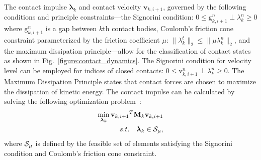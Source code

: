 The contact impulse $\bm\lambda_{k}$ and contact velocity $\textbf{v}_{k,i+1}$, governed by the following conditions and principle constraints—the Signorini condition: $0\leq\text{g}^{n}_{k,i+1}\perp{{\lambda}^{n}_{k}}\geq0$ where $\text{g}^{n}_{k,i+1}$ is a gap between $k$th contact bodies, Coulomb's friction cone constraint parameterized by the friction coefficient $\mu$: $\| \lambda^{t}_{k} \|_{2} \leq \|\mu\lambda^{n}_{k}\|_{2} $, and the maximum dissipation principle—allow for the classification of contact states as shown in Fig.~\ref{figure:contact_dynamics}. The Signorini condition for velocity level can be employed for indices of closed contacts: $0\leq\text{v}^{n}_{k,i+1}\perp{{\lambda}^{n}_{k}}\geq0$.
The Maximum Dissipation Principle states that contact forces are chosen to maximize the dissipation of kinetic
energy.
The contact impulse can be calculated by solving the following optimization problem~\cite{moreau1977application}:
\begin{align}
\label{eq:minvel}
    \min_{\bm{\lambda}_k}{\mathbf{v}_{k,i+1}}^T \mathbf{M}_{k}{\mathbf{v}_{k,i+1}}\\
    s.t. \quad \bm{\lambda}_k\in {\cal{S}}_{\mu}\nonumber,
\end{align}
where ${\cal{S}}_\mu$ is defined by the feasible set of elements satisfying the Signorini condition and Coulomb's friction cone constraint.





